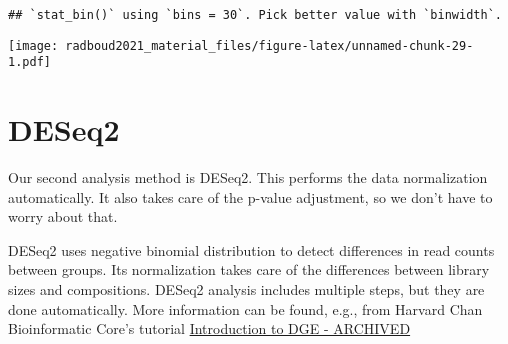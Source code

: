 \documentclass[
  oneside]{book}
\newenvironment{Shaded}{\begin{snugshade}}{\end{snugshade}}
\newcommand{\DataTypeTok}[1]{\textcolor[rgb]{0.13,0.29,0.53}{#1}}
\newcommand{\KeywordTok}[1]{\textcolor[rgb]{0.13,0.29,0.53}{\textbf{#1}}}
\newcommand{\NormalTok}[1]{#1}
\newcommand{\OperatorTok}[1]{\textcolor[rgb]{0.81,0.36,0.00}{\textbf{#1}}}
\newcommand{\StringTok}[1]{\textcolor[rgb]{0.31,0.60,0.02}{#1}}
\begin{document}
\begin{Shaded}
\end{Shaded}

\begin{verbatim}
## `stat_bin()` using `bins = 30`. Pick better value with `binwidth`.
\end{verbatim}

\texttt{[image: radboud2021\_material\_files/figure-latex/unnamed-chunk-29-1.pdf]}

\hypertarget{deseq2}{%
\section{DESeq2}\label{deseq2}}

Our second analysis method is DESeq2. This performs the data
normalization automatically. It also takes care of the p-value
adjustment, so we don't have to worry about that.

DESeq2 uses negative binomial distribution to detect differences in
read counts between groups. Its normalization takes care of the
differences between library sizes and compositions. DESeq2 analysis
includes multiple steps, but they are done automatically. More
information can be found, e.g., from Harvard Chan Bioinformatic Core's
tutorial \href{https://hbctraining.github.io/DGE_workshop/lessons/04_DGE_DESeq2_analysis.html}{Introduction to DGE -
ARCHIVED}
\end{document}
